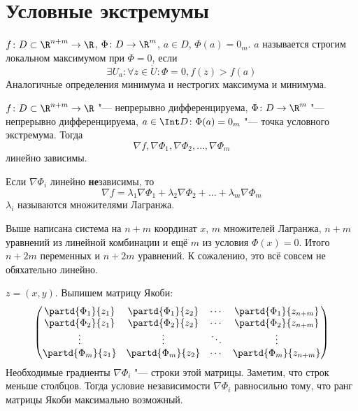 \section{Условные экстремумы}

\begin{Def}
	$f\colon D \subset \R^{n+m} \to \R$, $\Phi\colon D \to \R^m$, $a \in D$, $\Phi(a) = 0_m$.
	$a$ называется строгим локальном максимумом при $\Phi = 0$, если
	\[ \exists U_a\colon \forall z \in \mathring U\colon \Phi = 0, f(z) > f(a) \]
	Аналогичные определения минимума и нестрогих максимума и минимума.
\end{Def}

\begin{theorem}
	$f\colon D \subset \R^{n+m} \to \R$ "--- непрерывно дифференцируема,
	$\Phi\colon D \to \R^m$ "--- непрерывно дифференцируема,
	$a \in \Int D\colon \Phi(a) = 0_m$ "--- точка условного экстремума.
	Тогда
	\[ \nabla f, \nabla \Phi_1, \nabla \Phi_2, \dots, \nabla \Phi_m \]
	линейно зависимы.
\end{theorem}
\begin{Def}
	Если $\nabla \Phi_i$ линейно \textbf{не}зависимы, то
	\[ \nabla f = \lambda_1 \nabla \Phi_1 + \lambda_2 \nabla \Phi_2 + \dots + \lambda_m \nabla \Phi_m \]
	$\lambda_i$ называются множителями Лагранжа.
\end{Def}
\begin{Rem}
	Выше написана система на $n + m$ координат $x$, $m$ множителей Лагранжа,
	$n + m$ уравнений из линейной комбинации и ещё $m$ из условия $\Phi(x) = 0$.
	Итого $n + 2m$ переменных и $n + 2m$ уравнений.
	К сожалению, это всё совсем не обяхательно линейно.
\end{Rem}
\begin{Rem}
	$z = (x, y)$. Выпишем матрицу Якоби:
	\[
		\begin{pmatrix}
			\partd{\Phi_1}{z_1} & \partd{\Phi_1}{z_2} & \cdots & \partd{\Phi_1}{z_{n+m}} \\
			\partd{\Phi_2}{z_1} & \partd{\Phi_2}{z_2} & \cdots & \partd{\Phi_2}{z_{n+m}} \\
			\vdots & \vdots & \ddots & \vdots \\
			\partd{\Phi_m}{z_1} & \partd{\Phi_m}{z_2} & \cdots & \partd{\Phi_m}{z_{n+m}} \\
		\end{pmatrix}
	\]
	Необходимые градиенты $\nabla \Phi_i$ "--- строки этой матрицы.
	Заметим, что строк меньше столбцов.
	Тогда условие независимости $\nabla \Phi_i$ равносильно тому, что ранг матрицы Якоби максимально возможный.
\end{Rem}
